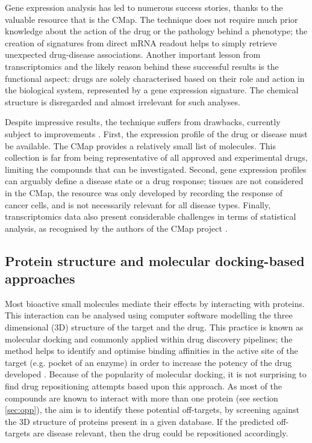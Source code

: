Gene expression analysis has led to numerous success stories, thanks to the valuable resource that is the CMap. The technique does not require much prior knowledge about the action of the drug or the pathology behind a phenotype; the creation of signatures from direct mRNA readout helps to simply retrieve unexpected drug-disease associations. Another important lesson from transcriptomics and the likely reason behind these successful results is the functional aspect: drugs are solely characterised based on their role and action in the biological system, represented by a gene expression signature. The chemical structure is disregarded and almost irrelevant for such analyses.

Despite impressive results, the technique suffers from drawbacks, currently subject to improvements \citep{cmap}. First, the expression profile of the drug or disease must be available. The CMap provides a relatively small list of molecules. This collection is far from being representative of all approved and experimental drugs, limiting the compounds that can be investigated. Second, gene expression profiles can arguably define a disease state or a drug response; tissues are not considered in the CMap, the resource was only developed by recording the response of cancer cells, and is not necessarily relevant for all disease types. Finally, transcriptomics data also present considerable challenges in terms of statistical analysis, as recognised by the authors of the CMap project \citep{lamb2006connectivity}.


\subsection{Protein structure and molecular docking-based approaches}
Most bioactive small molecules mediate their effects by interacting with proteins. This interaction can be analysed using computer software modelling the three dimensional (3D) structure of the target and the drug. This practice is known as molecular docking and commonly applied within drug discovery pipelines; the method helps to identify and optimise binding affinities in the active site of the target (e.g. pocket of an enzyme) in order to increase the potency of the drug developed \citep{haupt2011old}. Because of the popularity of molecular docking, it is not surprising to find drug repositioning attempts based upon this approach. As most of the compounds are known to interact with more than one protein (see section \ref{sec:opp}), the aim is to identify these potential off-targets, by screening against the 3D structure of proteins present in a given database. If the predicted off-targets are disease relevant, then the drug could be repositioned accordingly.

